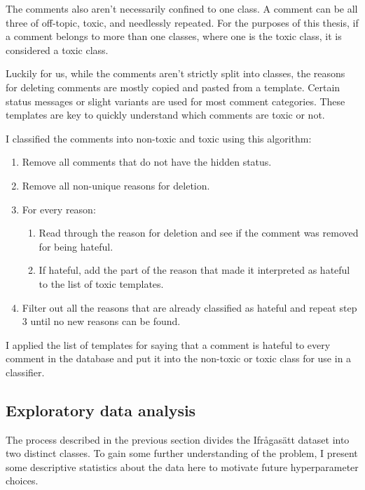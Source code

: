 \documentclass[nofilelist]{cslthse-msc}
\begin{document}
The comments also aren't necessarily confined to one class. A comment can be all three of off-topic, toxic, and needlessly repeated. For the purposes of this thesis, if a comment belongs to more than one classes, where one is the toxic class, it is considered a toxic class.

Luckily for us, while the comments aren't strictly split into classes, the reasons for deleting comments are mostly copied and pasted from a template. Certain status messages or slight variants are used for most comment categories. These templates are key to quickly understand which comments are toxic or not.

I classified the comments into non-toxic and toxic using this algorithm:

\begin{enumerate}
    \item Remove all comments that do not have the hidden status.
    \item Remove all non-unique reasons for deletion.
    \item For every reason:
     \begin{enumerate}
         \item Read through the reason for deletion and see if the comment was removed for being hateful.
         
         \item If hateful, add the part of the reason that made it interpreted as hateful to the list of toxic templates.
     \end{enumerate}
    \item Filter out all the reasons that are already classified as hateful and repeat step 3 until no new reasons can be found.
\end{enumerate}

I applied the list of templates for saying that a comment is hateful to every comment in the database and put it into the non-toxic or toxic class for use in a classifier.

\subsection{Exploratory data analysis}

The process described in the previous section divides the Ifrågasätt dataset into two distinct classes. To gain some further understanding of the problem, I present some descriptive statistics about the data here to motivate future hyperparameter choices.
\end{document}
